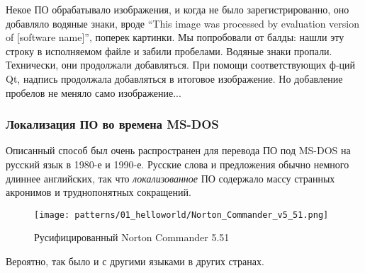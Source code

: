Некое ПО обрабатывало изображения, и когда не было зарегистрированно, оно добавляло водяные знаки,
вроде ``This image was processed by evaluation version of [software name]'', поперек картинки.
Мы попробовали от балды: нашли эту строку в исполняемом файле и забили пробелами.
Водяные знаки пропали.
Технически, они продолжали добавляться.
При помощи соответствующих ф-ций Qt, надпись продолжала добавляться в итоговое изображение.
Но добавление пробелов не меняло само изображение...

\subsubsection{Локализация ПО во времена MS-DOS}

Описанный способ был очень распространен для перевода ПО под MS-DOS на русский язык в 1980-е и 1990-е.
Русские слова и предложения обычно немного длиннее английских, так что \emph{локализованное} ПО содержало
массу странных акронимов и труднопонятных сокращений.

\begin{figure}[H]
\centering
\texttt{[image: patterns/01\_helloworld/Norton\_Commander\_v5\_51.png]}
\caption{Русифицированный Norton Commander 5.51}
\end{figure}

Вероятно, так было и с другими языками в других странах.

